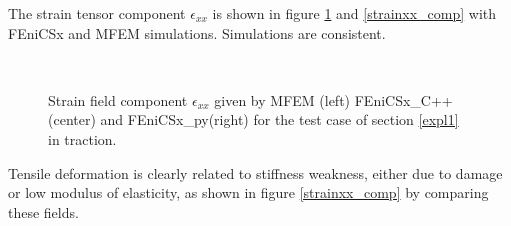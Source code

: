\documentclass[12pt]{article}
\newcommand{\f}[1]{FEniCSx#1}
\newcommand{\tens}[1]{
	{\ensuremath{\mathsf{#1}}}
}
\begin{document}
The strain tensor component $\tens{\epsilon}_{xx}$ is shown in figure \ref{strainxx} and \ref{strainxx_comp} with \f{} and MFEM simulations. 
Simulations are consistent. 
\begin{figure}
\\
	\caption{Strain  field component $\tens{\epsilon}_{xx}$ given by MFEM (left) \f{\_C++}(center) and \f{\_py}(right) for the test case of section \ref{expl1} in traction.\label{strainxx}}
\end{figure}
Tensile deformation is clearly related to stiffness weakness, either due to damage or low modulus of elasticity, as shown in figure \ref{strainxx_comp} by comparing these fields. 
\end{document}
